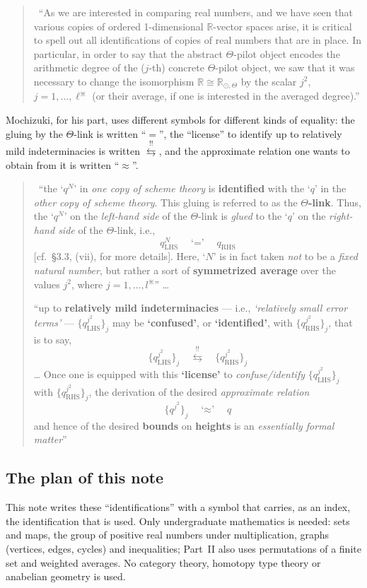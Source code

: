 \documentclass[11pt,a4paper]{article}
\newcommand{\lab}[2]{{\upshape\fcolorbox{#1}{#1!8}{\scriptsize\sffamily\bfseries\textcolor{#1}{#2}}}}
\newcommand{\tagS}{\lab{blue}{S}}
\newcommand{\q}[1]{``#1''}
\newcommand{\srcquote}[2]{\begin{quote}\small\tagS\ #1\par\nopagebreak\hfill{\footnotesize #2}\end{quote}}
\theoremstyle{plain}
\theoremstyle{definition}
\theoremstyle{remark}
\begin{document}
\srcquote{\q{As we are interested in comparing real numbers, and we have seen that various copies of ordered
1-dimensional $\mathbb{R}$-vector spaces arise, it is critical to spell out all identifications of copies of real numbers
that are in place. In particular, in order to say that the abstract $\Theta$-pilot object encodes the arithmetic degree of
the ($j$-th) concrete $\Theta$-pilot object, we saw that it was necessary to change the isomorphism
$\mathbb{R}\cong\mathbb{R}_{\odot,\Theta}$ by the scalar $j^2$, $j=1,\dots,\ell^{\divideontimes}$ (or their average, if one
is interested in the averaged degree).}}{\cite[\S2.2]{SS}}

Mochizuki, for his part, uses different symbols for different kinds of equality: the gluing by the $\Theta$-link is
written ``$=$'', the \q{license} to identify up to relatively mild indeterminacies is written
$\overset{!!}{\leftrightarrows}$, and the approximate relation one wants to obtain from it is written ``$\approx$''.

\srcquote{\q{the `$q^N$' in \emph{one copy of scheme theory} is \textbf{identified} with the `$q$' in the \emph{other
copy of scheme theory}. This gluing is referred to as the \textbf{\boldmath$\Theta$-link}. Thus, the `$q^N$' on the
\emph{left-hand side} of the $\Theta$-link is \emph{glued} to the `$q$' on the \emph{right-hand side} of the
$\Theta$-link, i.e.,
\[q^N_{\mathrm{LHS}}\quad\text{`$=$'}\quad q_{\mathrm{RHS}}\]
[cf.\ \S3.3, (vii), for more details]. Here, `$N$' is in fact taken \emph{not} to be a \emph{fixed natural number}, but
rather a sort of \textbf{symmetrized average} over the values $j^2$, where $j=1,\ldots,l^{\divideontimes}$} \dots\par
\q{up to \textbf{relatively mild indeterminacies} --- i.e., \emph{`relatively small error terms'} ---
$\{q^{j^2}_{\mathrm{LHS}}\}_j$ may be \textbf{`confused'}, or \textbf{`identified'}, with $\{q^{j^2}_{\mathrm{RHS}}\}_j$,
that is to say,
\[\{q^{j^2}_{\mathrm{LHS}}\}_j\quad\overset{!!}{\leftrightarrows}\quad\{q^{j^2}_{\mathrm{RHS}}\}_j\]
\dots{} Once one is equipped with this \textbf{`license'} to \emph{confuse/identify} $\{q^{j^2}_{\mathrm{LHS}}\}_j$ with
$\{q^{j^2}_{\mathrm{RHS}}\}_j$, the derivation of the desired \emph{approximate relation}
\[\{q^{j^2}\}_j\quad\text{`$\approx$'}\quad q\]
and hence of the desired \textbf{bounds} on \textbf{heights} is an \emph{essentially formal matter}}}{\cite[Introduction]{Alien}}

\subsection{The plan of this note}
This note writes these ``identifications'' with a symbol that carries, as an index, the identification that is used.
Only undergraduate mathematics is needed: sets and maps, the group of positive real numbers under multiplication,
graphs (vertices, edges, cycles) and inequalities; Part~II also uses permutations of a finite set and weighted
averages. No category theory, homotopy type theory or anabelian geometry is used.
\end{document}

